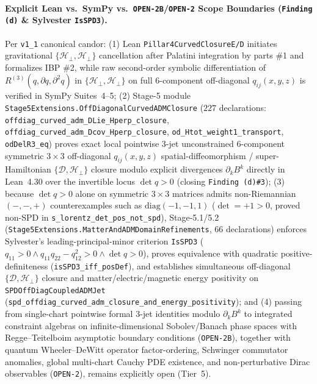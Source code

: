 \paragraph{Explicit Lean vs.\ SymPy vs.\ \texttt{OPEN-2B}/\texttt{OPEN-2} Scope Boundaries (\texttt{Finding (d)} \& Sylvester \texttt{IsSPD3}).}
Per \texttt{v1\_1} canonical candor: (1) Lean \texttt{Pillar4\allowbreak{}Curved\allowbreak{}Closure\allowbreak{}E/D} initiates gravitational $\{\mathcal{H}_\perp,\mathcal{H}_\perp\}$ cancellation after Palatini integration by parts \#1 and formalizes IBP \#2, while raw second-order symbolic differentiation of $R^{(3)}(q,\partial q,\partial^2 q)$ in $\{\mathcal{H}_\perp,\mathcal{H}_\perp\}$ on full 6-component off-diagonal $q_{ij}(x,y,z)$ is verified in SymPy Suites~4--5; (2) Stage-5 module \texttt{Stage5\allowbreak{}Extensions.\allowbreak{}Off\allowbreak{}Diagonal\allowbreak{}Curved\allowbreak{}ADMClosure} ($227$ declarations: \texttt{offdiag\_\allowbreak{}curved\_\allowbreak{}adm\_\allowbreak{}DLie\_\allowbreak{}Hperp\_\allowbreak{}closure}, \texttt{offdiag\_\allowbreak{}curved\_\allowbreak{}adm\_\allowbreak{}Dcov\_\allowbreak{}Hperp\_\allowbreak{}closure}, \texttt{od\_\allowbreak{}Htot\_\allowbreak{}weight1\_\allowbreak{}transport}, \texttt{odDelR3\_eq}) proves exact local pointwise 3-jet unconstrained 6-component symmetric $3\times 3$ off-diagonal $q_{ij}(x,y,z)$ spatial-diffeomorphism / super-Hamiltonian $\{\mathcal{D},\mathcal{H}_\perp\}$ closure modulo explicit divergences $\partial_k B^k$ directly in Lean~4.30 over the invertible locus $\det q > 0$ (closing \texttt{Finding (d)\#3}); (3) because $\det q > 0$ alone on symmetric $3\times 3$ matrices admits non-Riemannian $(-,-,+)$ counterexamples such as $\mathrm{diag}(-1,-1,1)$ ($\det = +1 > 0$, proved non-SPD in \texttt{s\_\allowbreak{}lorentz\_\allowbreak{}det\_\allowbreak{}pos\_\allowbreak{}not\_\allowbreak{}spd}), Stage-5.1/5.2 (\texttt{Stage5\allowbreak{}Extensions.\allowbreak{}Matter\allowbreak{}And\allowbreak{}ADMDomain\allowbreak{}Refinements}, $66$ declarations) enforces Sylvester's leading-principal-minor criterion \texttt{IsSPD3} ($q_{11} > 0 \wedge q_{11}q_{22}-q_{12}^2 > 0 \wedge \det q > 0$), proves equivalence with quadratic positive-definiteness (\texttt{isSPD3\_iff\_posDef}), and establishes simultaneous off-diagonal $\{\mathcal{D},\mathcal{H}_\perp\}$ closure and matter/electric/magnetic energy positivity on \texttt{SPDOff\allowbreak{}Diag\allowbreak{}Coupled\allowbreak{}ADMJet} (\texttt{spd\_\allowbreak{}offdiag\_\allowbreak{}curved\_\allowbreak{}adm\_\allowbreak{}closure\_\allowbreak{}and\_\allowbreak{}energy\_\allowbreak{}positivity}); and (4) passing from single-chart pointwise formal 3-jet identities modulo $\partial_k B^k$ to integrated constraint algebras on infinite-dimensional Sobolev/Banach phase spaces with Regge--Teitelboim asymptotic boundary conditions (\texttt{OPEN-2B}), together with quantum Wheeler--DeWitt operator factor-ordering, Schwinger commutator anomalies, global multi-chart Cauchy PDE existence, and non-perturbative Dirac observables (\texttt{OPEN-2}), remains explicitly open (Tier~5).

